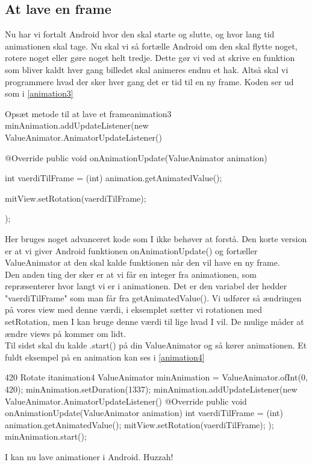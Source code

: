 \subsection{At lave en frame}
Nu har vi fortalt Android hvor den skal starte og slutte, og hvor lang tid animationen skal tage. Nu skal vi så fortælle Android om den skal flytte noget, rotere noget eller gøre noget helt tredje. Dette gør vi ved at skrive en funktion som bliver kaldt hver gang billedet skal animeres endnu et hak. Altså skal vi programmere hvad der sker hver gang det er tid til en ny frame. Koden ser ud som i \autoref{animation3}
\begin{JavaCode}{Opsæt metode til at lave et frame}{animation3}
	minAnimation.addUpdateListener(new ValueAnimator.AnimatorUpdateListener() {
		@Override
		public void onAnimationUpdate(ValueAnimator animation) {
			int vaerdiTilFrame = (int) animation.getAnimatedValue();
			
			mitView.setRotation(vaerdiTilFrame);
		}
	});
\end{JavaCode}
Her bruges noget advanceret kode som I ikke behøver at forstå. Den korte version er at vi giver Android funktionen onAnimationUpdate() og fortæller ValueAnimator at den skal kalde funktionen når den vil have en ny frame.\\
Den anden ting der sker er at vi får en integer fra animationen, som repræsenterer hvor langt vi er i animationen. Det er den variabel der hedder "vaerdiTilFrame" som man får fra getAnimatedValue(). Vi udfører så ændringen på vores view med denne værdi, i eksemplet sætter vi rotationen med setRotation, men I kan bruge denne værdi til lige hvad I vil. De mulige måder at ændre views på kommer om lidt.\\
Til sidst skal du kalde .start() på din ValueAnimator og så kører animationen. Et fuldt eksempel på en animation kan ses i \autoref{animation4}
\begin{JavaCode}{420 Rotate it}{animation4}
	ValueAnimator minAnimation = ValueAnimator.ofInt(0, 420);
	minAnimation.setDuration(1337);
	minAnimation.addUpdateListener(new ValueAnimator.AnimatorUpdateListener() {
		@Override
		public void onAnimationUpdate(ValueAnimator animation) {
			int vaerdiTilFrame = (int) animation.getAnimatedValue();
			mitView.setRotation(vaerdiTilFrame);
		}
	});
	minAnimation.start();
\end{JavaCode}
I kan nu lave animationer i Android. Huzzah!

